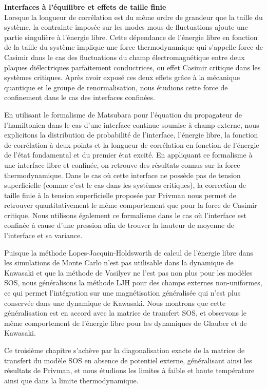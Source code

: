 {\bf \large Interfaces à l'équilibre et effets de taille finie} \\

Lorsque la longueur de corrélation est du même ordre de grandeur que la taille du système, la contrainte imposée sur les modes mous de fluctuations ajoute une partie singulière à l'énergie libre. Cette dépendance de l'énergie libre en fonction de la taille du système implique une force thermodynamique qui s'appelle force de Casimir dans le cas des fluctuations du champ électromagnétique entre deux plaques diélectriques parfaitement conductrices, ou effet Casimir critique dans les systèmes critiques. Après avoir exposé ces deux effets grâce à la mécanique quantique et le groupe de renormalisation, nous étudions cette force de confinement dans le cas des interfaces confinées. 

En utilisant le formalisme de Matsubara pour l'équation du propagateur de l'hamiltonien dans le cas d'une interface continue soumise à champ externe, nous explicitons la distribution de probabilité de l'interface, l'énergie libre, la fonction de corrélation à deux points et la longueur de corrélation en fonction de l'énergie de l'état fondamental et du premier état excité. En appliquant ce formalisme à une interface libre et confinée, on retrouve des résultats connus sur la force thermodynamique. Dans le cas où cette interface ne possède pas de tension superficielle (comme c'est le cas dans les systèmes critiques), la correction de taille finie à la tension superficielle proposée par Privman nous permet de retrouver quantitativement le même comportement que pour la force de Casimir critique. Nous utilisons également ce formalisme dans le cas où l'interface est confinée à cause d'une pression afin de trouver la hauteur de moyenne de l'interface et sa variance.

Puisque la méthode Lopes-Jacquin-Holdsworth de calcul de l'énergie libre dans les simulations de Monte Carlo n'est pas utilisable dans la dynamique de Kawasaki et que la méthode de Vasilyev ne l'est pas non plus pour les modèles SOS, nous généralisons la méthode LJH pour des champs externes non-uniformes, ce qui permet l'intégration sur une magnétisation généralisée qui n'est plus conservée dans une dynamique de Kawasaki. Nous montrons que cette généralisation est en accord avec la matrice de transfert SOS, et observons le même comportement de l'énergie libre pour les dynamiques de Glauber et de Kawasaki.

Ce troisième chapitre s'achève par la diagonalisation exacte de la matrice de transfert du modèle SOS en absence de potentiel externe, généralisant ainsi les résultats de Privman, et nous étudions les limites à faible et haute température ainsi que dans la limite thermodynamique.\\

